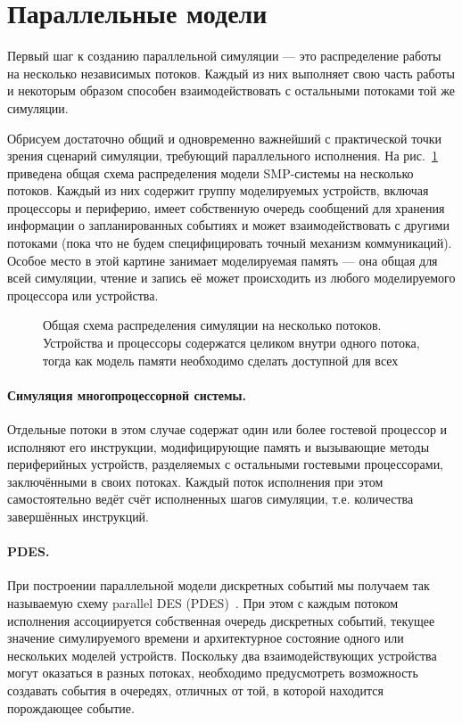 \section{Параллельные модели}

Первый шаг к созданию параллельной симуляции — это распределение работы на несколько независимых потоков. Каждый из них выполняет свою часть работы и некоторым образом способен взаимодействовать с остальными потоками той же симуляции. 

Обрисуем достаточно общий и одновременно важнейший с практической точки зрения сценарий симуляции, требующий параллельного исполнения. На рис.~\ref{fig:parsim-overview} приведена общая схема распределения модели SMP-системы на несколько потоков. Каждый из них содержит группу моделируемых устройств, включая процессоры и периферию, имеет собственную очередь сообщений для хранения информации о запланированных событиях и может взаимодействовать с другими потоками (пока что не будем специфицировать точный механизм коммуникаций). Особое место в этой картине занимает моделируемая память — она общая для всей симуляции, чтение и запись её может происходить из любого моделируемого процессора или устройства.

\begin{figure}[htbp]
    \centering
    \caption[Общая схема распределения симуляции на несколько потоков]{Общая схема распределения симуляции на несколько потоков. Устройства и процессоры содержатся целиком внутри одного потока, тогда как модель памяти необходимо сделать доступной для всех}
    \label{fig:parsim-overview}
\end{figure}

\paragraph{Симуляция многопроцессорной системы.} Отдельные потоки в этом случае содержат один или более гостевой процессор и исполняют его инструкции, модифицирующие память и вызывающие методы периферийных устройств, разделяемых с остальными гостевыми процессорами, заключёнными в своих потоках. Каждый поток исполнения при этом самостоятельно ведёт счёт исполненных шагов симуляции, т.е. количества завершённых инструкций.

\paragraph{PDES.} При построении параллельной модели дискретных событий мы получаем так называемую схему parallel DES (PDES)~\cite{fujimoto-parallel-dist-sim, Fujimoto-pdes, Liu09paralleldiscrete-event, ferscha-1995-pdes}. При этом с каждым потоком исполнения ассоциируется собственная очередь дискретных событий, текущее значение симулируемого времени и архитектурное состояние одного или нескольких моделей устройств. Поскольку два взаимодействующих устройства могут оказаться в разных потоках, необходимо предусмотреть возможность создавать события в очередях, отличных от той, в которой находится порождающее событие.

